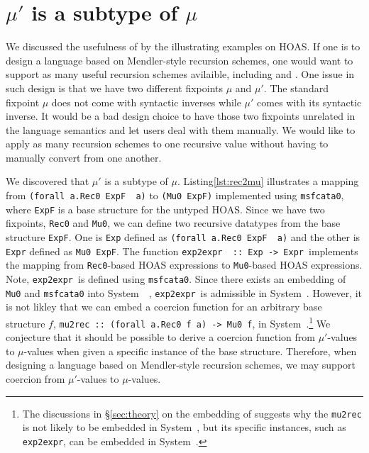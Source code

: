 \section{$\mu'$ is a subtype of $\mu$}\label{sec:murec}
We discussed the usefulness of \msfit{} by the illustrating examples on HOAS.
If one is to design a language based on Mendler-style recursion schemes,
one would want to support as many useful recursion schemes avilaible,
including \MIt{} and \msfit{}. One issue in such design is that we have
two different fixpoints $\mu$ and $\mu'$. The standard fixpoint $\mu$
does not come with syntactic inverses while $\mu'$ comes with
its syntactic inverse. It would be a bad design choice to have those
two fixpoints unrelated in the language semantics and let users deal
with them manually. We would like to apply as many recursion schemes to
one recursive value without having to manually convert from one another.

We discovered that $\mu'$ is a subtype of $\mu$. Listing\;\ref{lst:rec2mu}
illustrates a mapping from \lstinline{(forall a.Rec0 ExpF  a)}
to \lstinline{(Mu0 ExpF)} implemented using \lstinline{msfcata0},
where \lstinline{ExpF} is a base structure for the untyped HOAS.
Since we have two fixpoints, \lstinline{Rec0} and \lstinline{Mu0},
we can define two recursive datatypes from the base structure \lstinline{ExpF}.
One is \lstinline{Exp} defined as \lstinline{(forall a.Rec0 ExpF  a)} and
the other is \lstinline{Expr} defined as \lstinline{Mu0 ExpF}.
The function \lstinline{exp2expr  :: Exp -> Expr}\, implements the mapping from
\lstinline{Rec0}-based HOAS expressions to \lstinline{Mu0}-based
HOAS expressions. Note, \lstinline{exp2expr}\, is defined
using \lstinline{msfcata0}.  Since there exists an embedding of
\lstinline{Mu0} and \lstinline{msfcata0} into System~\Fw\ \cite{AhnShe11},
\lstinline{exp2expr}\, is admissible in System~\Fw. However, it is not likley
that we can embed a coercion function for an arbitrary base structure $f$,
\lstinline{mu2rec :: (forall a.Rec0 f a) -> Mu0 f}, in System~\Fw.\footnote{
	The discussions in \S\ref{sec:theory} on the embedding of \msfit{}
	suggests why the \lstinline{mu2rec} is not likely to be embedded
	in System~\Fw, but its specific instances, such as
	\lstinline{exp2expr}, can be embedded in System~\Fw.}
We conjecture that it should be possible to derive a coercion function
from $\mu'$-values to $\mu$-values when given a specific instance of
the base structure. Therefore, when designing a language based on Mendler-style
recursion schemes, we may support coercion from $\mu'$-values to $\mu$-values.

